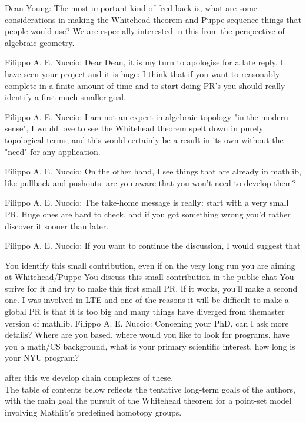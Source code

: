 \documentclass{book}
\theoremstyle{definition}
\begin{document}
Dean Young: The most important kind of feed back is, what are some considerations in making the Whitehead theorem and Puppe sequence things that people would use? We are especially interested in this from the perspective of algebraic geometry.

Filippo A. E. Nuccio: Dear Dean, it is my turn to apologise for a late reply. I have seen your project and it is huge: I think that if you want to reasonably complete in a finite amount of time and to start doing PR's you should really identify a first much smaller goal.

Filippo A. E. Nuccio: I am not an expert in algebraic topology "in the modern sense", I would love to see the Whitehead theorem spelt down in purely topological terms, and this would certainly be a result in its own without the "need" for any application.

Filippo A. E. Nuccio: On the other hand, I see things that are already in mathlib, like pullback and pushouts: are you aware that you won't need to develop them?

Filippo A. E. Nuccio: The take-home message is really: start with a very small PR. Huge ones are hard to check, and if you got something wrong you'd rather discover it sooner than later.

Filippo A. E. Nuccio: If you want to continue the discussion, I would suggest that

You identify this small contribution, even if on the very long run you are aiming at Whitehead/Puppe
You discuss this small contribution in the public chat
You strive for it and try to make this first small PR. If it works, you'll make a second one. I was involved in LTE and one of the reasons it will be difficult to make a global PR is that it is too big and many things have diverged from themaster version of mathlib.
Filippo A. E. Nuccio: Concening your PhD, can I ask more details? Where are you based, where would you like to look for programs, have you a math/CS background, what is your primary scientific interest, how long is your NYU program?
\fi

after this we develop chain complexes of these.\\


The table of contents below reflects the tentative long-term goals of the authors, with the main goal the pursuit of the Whitehead theorem for a point-set model involving Mathlib's predefined homotopy groups.\\
\end{document}
